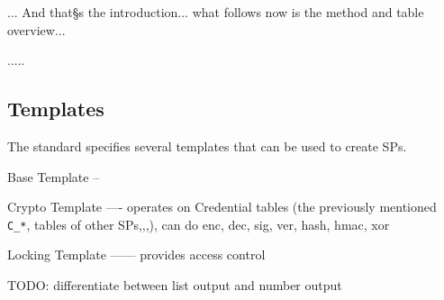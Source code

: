 ... And that§s the introduction... what follows now is the method and table overview...


.....

\subsection{Templates}

The standard specifies several templates that can be used to create SPs.


Base Template --

Crypto Template ---- operates on Credential tables (the previously mentioned \verb|C_*|, tables of other SPs,,,), can do enc, dec, sig, ver, hash, hmac, xor

Locking Template ------ provides access control



TODO: differentiate between list output and number output 














